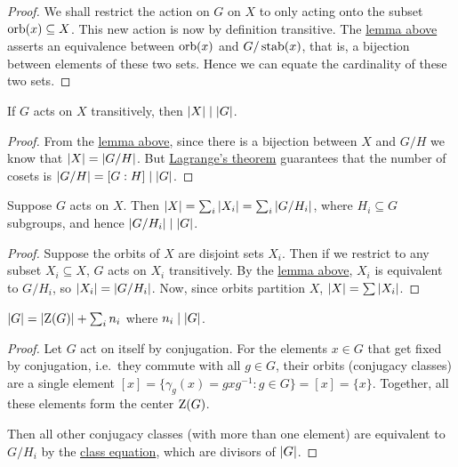\begin{proof}
    We shall restrict the action on \(G\) on \(X\)
    to only acting onto the subset \(\operatorname{orb}(x) \subseteq X\).
    This new action is now by definition transitive.
    The \hyperref[lem:transitive-orbit-subgroup]{lemma above}
    asserts an equivalence between \(\operatorname{orb}(x)\) and \(G/\operatorname{stab}(x)\),
    that is, a bijection between elements of these two sets.
    Hence we can equate the cardinality of these two sets.
\end{proof}
\begin{corollary}\label{cor:transitive-cardinality}
    If \(G\) acts on \(X\) transitively,
    then \(\abs{X} \mid \abs{G}\).
\end{corollary}
\begin{proof}
    From the \hyperref[lem:transitive-orbit-subgroup]{lemma above},
    since there is a bijection between \(X\) and \(G/H\)
    we know that \(\abs{X} = \abs{G/H}\).
    But \hyperref[thm:lagrange]{Lagrange's theorem}
    guarantees that the number of cosets is \(\abs{G/H} = [G:H] \mid \abs{G}\).
\end{proof}

\begin{theorem}\label{thm:class-equation}
    Suppose \(G\) acts on \(X\).
    Then \(\abs{X} = \sum_i \abs{X_i} = \sum_i \abs{G/H_i}\),
    where \(H_i \subseteq G\) subgroups,
    and hence \(\abs{G/H_i} \mid \abs{G}\).
\end{theorem}
\begin{proof}
    Suppose the orbits of \(X\) are disjoint sets \(X_i\).
    Then if we restrict to any subset \(X_i \subseteq X\),
    \(G\) acts on \(X_i\) transitively.
    By the \hyperref[lem:transitive-orbit-subgroup]{lemma above},
    \(X_i\) is equivalent to \(G/H_i\),
    so \(\abs{X_i} = \abs{G/H_i}\).
    Now, since orbits partition \(X\),
    \(\abs{X} = \sum \abs{X_i}\).
\end{proof}
\begin{corollary}
    \(\abs{G} = \abs{\operatorname{Z}(G)} + \sum_i n_i\)
    where \(n_i \mid \abs{G}\).
\end{corollary}
\begin{proof}
    Let \(G\) act on itself by conjugation.
    For the elements \(x \in G\) that get fixed by conjugation,
    i.e.\ they commute with all \(g \in G\),
    their orbits (conjugacy classes) are a single element
    \([x] = \{\gamma_g(x) = gxg^{-1} : g \in G\} = [x] = \{x\}\).
    Together, all these elements form the center \(\operatorname{Z}(G)\).

    Then all other conjugacy classes (with more than one element)
    are equivalent to \(G/H_i\)
    by the \hyperref[thm:class-equation]{class equation},
    which are divisors of \(\abs{G}\).
\end{proof}

